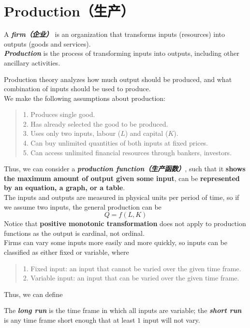 \section{Production（生产）}
\begin{definition}
    A \textbf{\textit{firm（企业）}} is an organization that transforms inputs (resources) into outputs (goods and services). \\
    \textbf{\textit{Production}} is the process of transforming inputs into outputs, including other ancillary activities.
\end{definition}
Production theory analyzes how much output should be produced, and what combination of inputs should be used to produce. \\
We make the following assumptions about production:
\begin{quote}
    1. Produces single good. \\
    2. Has already selected the good to be produced. \\
    3. Uses only two inputs, labour ($L$) and capital ($K$). \\
    4. Can buy unlimited quantities of both inputs at fixed prices. \\
    5. Can access unlimited financial resources through bankers, investors.
\end{quote}
Thus, we can consider a \textbf{\textit{production function（生产函数）}}, such that it \textbf{shows the maximum amount of output given some input}, can be \textbf{represented by an equation, a graph, or a table}. \\
The inputs and outputs are measured in physical units per period of time, so if we assume two inputs, the general production can be 
$$Q = f(L, K)$$
Notice that \textbf{positive monotonic transformation} does not apply to production functions as the output is cardinal, not ordinal. \\
Firms can vary some inputs more easily and more quickly, so inputs can be classified as either fixed or variable, where
\begin{quote}
    1. Fixed input: an input that cannot be varied over the given time frame. \\
    2. Variable input: an input that can be varied over the given time frame.
\end{quote}
Thus, we can define
\begin{definition}
    The \textbf{\textit{long run}} is the time frame in which all inputs are variable; the \textbf{\textit{short run}} is any time frame short enough that at least $1$ input will not vary.
\end{definition}


